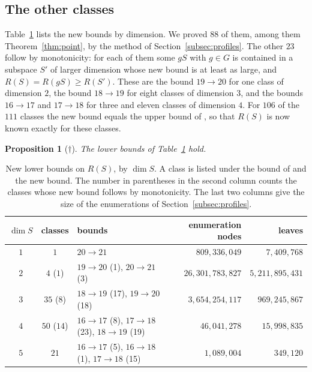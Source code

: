 \documentclass[11pt]{amsart}
\newtheorem{proposition}[theorem]{Proposition}
\theoremstyle{definition}
\theoremstyle{remark}
\numberwithin{equation}{section}
\begin{document}
\subsection{The other classes}
Table~\ref{tab:raise} lists the new bounds by dimension. We proved $88$ of them, among them Theorem~\ref{thm:point}, by the method of Section~\ref{subsec:profiles}. The other $23$ follow by monotonicity: for each of them some $gS$ with $g\in G$ is contained in a subspace $S'$ of larger dimension whose new bound is at least as large, and $R(S)=R(gS)\ge R(S')$. These are the bound $19\to 20$ for one class of dimension $2$, the bound $18\to 19$ for eight classes of dimension $3$, and the bounds $16\to 17$ and $17\to 18$ for three and eleven classes of dimension $4$. For $106$ of the $111$ classes the new bound equals the upper bound of \cite{RR26}, so that $R(S)$ is now known exactly for these classes.

\begin{proposition}[$\dagger$]\label{prop:raise}
The lower bounds of Table~\ref{tab:raise} hold.
\end{proposition}

\begin{table}[ht]
\caption{New lower bounds on $R(S)$, by $\dim S$. A class is listed under the bound of \cite{RR26} and the new bound. The number in parentheses in the second column counts the classes whose new bound follows by monotonicity. The last two columns give the size of the enumerations of Section~\ref{subsec:profiles}.}\label{tab:raise}
\centering
\small
\begin{tabular}{@{}ccp{}rr@{}}
\toprule
$\dim S$ & classes & bounds & enumeration nodes & leaves\\
\midrule
$1$ & $1$ & $20\to 21$ & $809{,}336{,}049$ & $7{,}409{,}768$\\
$2$ & $4$ ($1$) & $19\to 20$ (1), $20\to 21$ (3) & $26{,}301{,}783{,}827$ & $5{,}211{,}895{,}431$\\
$3$ & $35$ ($8$) & $18\to 19$ (17), $19\to 20$ (18) & $3{,}654{,}254{,}117$ & $969{,}245{,}867$\\
$4$ & $50$ ($14$) & $16\to 17$ (8), $17\to 18$ (23), $18\to 19$ (19) & $46{,}041{,}278$ & $15{,}998{,}835$\\
$5$ & $21$ & $16\to 17$ (5), $16\to 18$ (1), $17\to 18$ (15) & $1{,}089{,}004$ & $349{,}120$\\
\bottomrule
\end{tabular}
\end{table}
\end{document}
